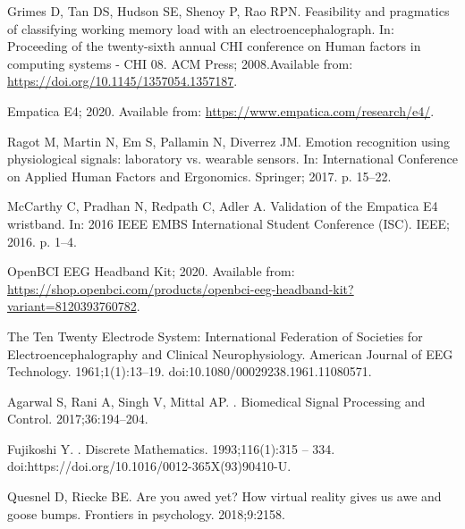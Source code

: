 \documentclass[10pt,letterpaper]{article}
\begin{document}
\begin{thebibliography}{10}
  Grimes D, Tan DS, Hudson SE, Shenoy P, Rao RPN.
  \newblock Feasibility and pragmatics of classifying working memory load with an
    electroencephalograph.
  \newblock In: Proceeding of the twenty-sixth annual {CHI} conference on Human
    factors in computing systems - {CHI} {\textquotesingle}08. {ACM} Press;
    2008.Available from: \url{https://doi.org/10.1145/1357054.1357187}.
  
  {Empatica E4}; 2020.
  \newblock Available from: \url{https://www.empatica.com/research/e4/}.
  
  Ragot M, Martin N, Em S, Pallamin N, Diverrez JM.
  \newblock Emotion recognition using physiological signals: laboratory vs.
    wearable sensors.
  \newblock In: International Conference on Applied Human Factors and Ergonomics.
    Springer; 2017. p. 15--22.
  
  McCarthy C, Pradhan N, Redpath C, Adler A.
  \newblock Validation of the {Empatica E4} wristband.
  \newblock In: 2016 IEEE EMBS International Student Conference (ISC). IEEE;
    2016. p. 1--4.
  
  {OpenBCI EEG Headband Kit}; 2020.
  \newblock Available from:
    \url{https://shop.openbci.com/products/openbci-eeg-headband-kit?variant=8120393760782}.
  
  The Ten Twenty Electrode System: International Federation of Societies for
    Electroencephalography and Clinical Neurophysiology.
  \newblock American Journal of EEG Technology. 1961;1(1):13--19.
  \newblock doi:{10.1080/00029238.1961.11080571}.
  
  Agarwal S, Rani A, Singh V, Mittal AP.
  .
  \newblock Biomedical Signal Processing and Control. 2017;36:194--204.
  
  Fujikoshi Y.
  .
  \newblock Discrete Mathematics. 1993;116(1):315 -- 334.
  \newblock doi:{https://doi.org/10.1016/0012-365X(93)90410-U}.
  
  Quesnel D, Riecke BE.
  \newblock Are you awed yet? How virtual reality gives us awe and goose bumps.
  \newblock Frontiers in psychology. 2018;9:2158.
  
  \end{thebibliography}
  
\end{document}
